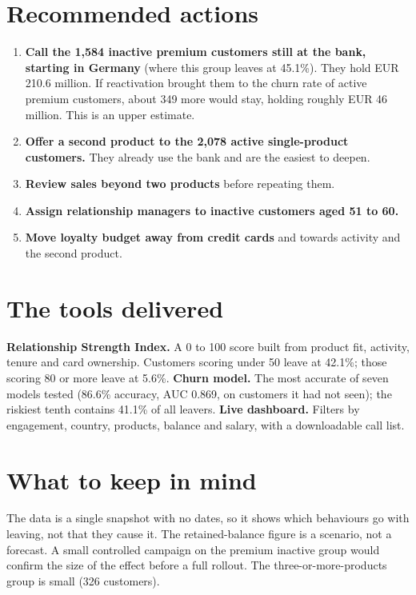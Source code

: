 \documentclass[10pt,a4paper]{article}
\begin{document}
\section{Recommended actions}
\begin{enumerate}[leftmargin=1.4em,itemsep=2pt,topsep=2pt]
\item \textbf{Call the 1,584 inactive premium customers still at the bank, starting in Germany} (where this group leaves at 45.1\%). They hold EUR 210.6 million. If reactivation brought them to the churn rate of active premium customers, about 349 more would stay, holding roughly EUR 46 million. This is an upper estimate.
\item \textbf{Offer a second product to the 2,078 active single-product customers.} They already use the bank and are the easiest to deepen.
\item \textbf{Review sales beyond two products} before repeating them.
\item \textbf{Assign relationship managers to inactive customers aged 51 to 60.}
\item \textbf{Move loyalty budget away from credit cards} and towards activity and the second product.
\end{enumerate}

\section{The tools delivered}
\textbf{Relationship Strength Index.} A 0 to 100 score built from product fit, activity, tenure and card ownership. Customers scoring under 50 leave at 42.1\%; those scoring 80 or more leave at 5.6\%. \textbf{Churn model.} The most accurate of seven models tested (86.6\% accuracy, AUC 0.869, on customers it had not seen); the riskiest tenth contains 41.1\% of all leavers. \textbf{Live dashboard.} Filters by engagement, country, products, balance and salary, with a downloadable call list.

\section{What to keep in mind}
The data is a single snapshot with no dates, so it shows which behaviours go with leaving, not that they cause it. The retained-balance figure is a scenario, not a forecast. A small controlled campaign on the premium inactive group would confirm the size of the effect before a full rollout. The three-or-more-products group is small (326 customers).
\end{document}
